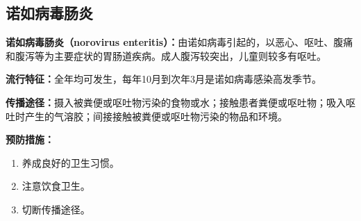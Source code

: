 \subsection{诺如病毒肠炎}

\begin{keybox}
\textbf{诺如病毒肠炎（norovirus enteritis）：}由诺如病毒引起的，以恶心、呕吐、腹痛和腹泻等为主要症状的胃肠道疾病。成人腹泻较突出，儿童则较多有呕吐。

\textbf{流行特征：}全年均可发生，每年10月到次年3月是诺如病毒感染高发季节。

\textbf{传播途径：}摄入被粪便或呕吐物污染的食物或水；接触患者粪便或呕吐物；吸入呕吐时产生的气溶胶；间接接触被粪便或呕吐物污染的物品和环境。

\textbf{预防措施：}
\begin{enumerate}[leftmargin=*]
    \item 养成良好的卫生习惯。
    \item 注意饮食卫生。
    \item 切断传播途径。
\end{enumerate}
\end{keybox}

\newpage
